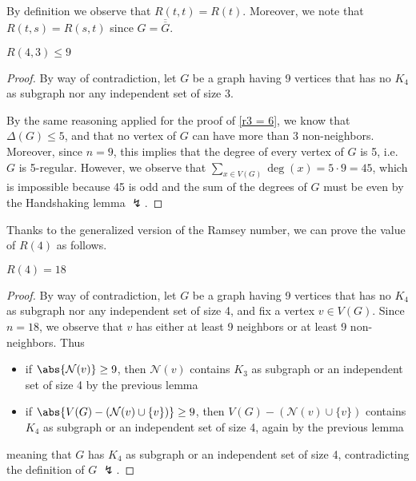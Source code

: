 \documentclass[a4paper, 12pt]{report}
\begin{document}
    By definition we observe that $R(t, t) = R(t)$. Moreover, we note that $R(t, s) = R(s, t)$ since $G = \overline{\overline G}$.
    
    \begin{framedlem}{}
        $R(4, 3) \le 9$
    \end{framedlem}

    \begin{proof}
        By way of contradiction, let $G$ be a graph having 9 vertices that has no $K_4$ as subgraph nor any independent set of size 3.

        By the same reasoning applied for the proof of \cref{r3 = 6}, we know that $\Delta(G) \le 5$, and that no vertex of $G$ can have more than 3 non-neighbors. Moreover, since $n = 9$, this implies that the degree of every vertex of $G$ is  5, i.e. $G$ is 5-regular. However, we observe that $\sum_{x \in V(G)}{\deg(x)} = 5 \cdot 9 = 45$, which is impossible because 45 is odd and the sum of the degrees of $G$ must be even by the Handshaking lemma $\lightning$.
    \end{proof}

    Thanks to the generalized version of the Ramsey number, we can prove the value of $R(4)$ as follows.

    \begin{framedcor}{}
        $R(4) = 18$
    \end{framedcor}

    \begin{proof}
        By way of contradiction, let $G$ be a graph having 9 vertices that has no $K_4$ as subgraph nor any independent set of size 4, and fix a vertex $v \in V(G)$. Since $n = 18$, we observe that $v$ has either at least 9 neighbors or at least 9 non-neighbors. Thus

        \begin{itemize}
            \item if $\abs{\mathcal N(v)} \ge 9$, then $\mathcal N (v)$ contains $K_3$ as subgraph or an independent set of size 4 by the previous lemma
            \item if $\abs{V(G) - (\mathcal N (v) \cup \{v\})} \ge 9$, then $V(G) - (\mathcal N (v) \cup \{v\})$ contains $K_4$ as subgraph or an independent set of size 4, again by the previous lemma
        \end{itemize}

        meaning that $G$ has $K_4$ as subgraph or an independent set of size 4, contradicting the definition of $G$ $\lightning$.
    \end{proof}
\end{document}
